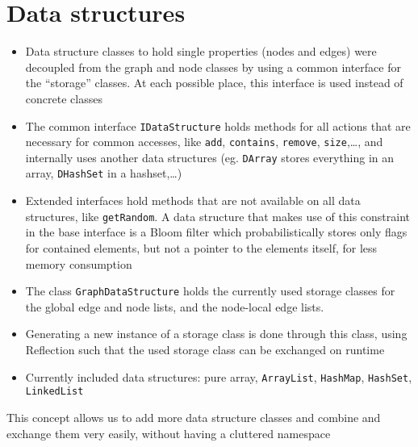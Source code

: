 \section{Data structures}
	\begin{itemize}
		\item Data structure classes to hold single properties (nodes and edges) were decoupled
			from the graph and node classes by using a common interface for the ``storage''
			classes. At each possible place, this interface is used instead of concrete classes
		\item The common interface \texttt{IDataStructure} holds methods for all actions that
			are necessary for common accesses, like \texttt{add}, \texttt{contains},
			\texttt{remove}, \texttt{size},\ldots, and internally uses another data structures (eg.
			\texttt{DArray} stores everything in an array, \texttt{DHashSet} in a hashset,\ldots)
		\item Extended interfaces hold methods that are not available on all data structures,
			like \texttt{getRandom}. A data structure that makes use of this constraint in the base
			interface is a Bloom filter which probabilistically stores only flags for contained
			elements, but not a pointer to the elements itself, for less memory consumption
		\item The class \texttt{GraphDataStructure} holds the currently used storage classes for
			the global edge and node lists, and the node-local edge lists.
		\item Generating a new instance of a storage class is done through this class, using
			Reflection such that the used storage class can be exchanged on runtime
		\item Currently included data structures: pure array, \texttt{ArrayList},
			\texttt{HashMap}, \texttt{HashSet}, \texttt{LinkedList}
	\end{itemize}
	
	This concept allows us to add more data structure classes and combine and exchange them
	very easily, without having a cluttered namespace
